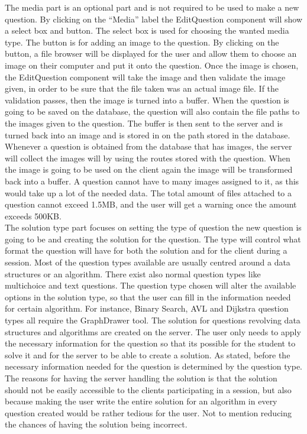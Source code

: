 The media part is an optional part and is not required to be used to make a new question. By clicking on the “Media” label the EditQuestion component will show a select box and button. The select box is used for choosing the wanted media type. The button is for adding an image to the question. By clicking on the button, a file browser will be displayed for the user and allow them to choose an image on their computer and put it onto the question. Once the image is chosen, the EditQuestion component will take the image and then validate the image given, in order to be sure that the file taken was an actual image file. If the validation passes, then the image is turned into a buffer. When the question is going to be saved on the database, the question will also contain the file paths to the images given to the question. The buffer is then sent to the server and is turned back into an image and is stored in on the path stored in the database. Whenever a question is obtained from the database that has images, the server will collect the images will by using the routes stored with the question. When the image is going to be used on the client again the image will be transformed back into a buffer. A question cannot have to many images assigned to it, as this would take up a lot of the needed data. The total amount of files attached to a question cannot exceed 1.5MB, and the user will get a warning once the amount exceeds 500KB.\\[11pt]
The solution type part focuses on setting the type of question the new question is going to be and creating the solution for the question. The type will control what format the question will have for both the solution and for the client during a session. Most of the question types available are usually centred around a data structures or an algorithm. There exist also normal question types like multichoice and text questions. The question type chosen will alter the available options in the solution type, so that the user can fill in the information needed for certain algorithm. For instance, Binary Search, AVL and Dijkstra question types all require the GraphDrawer tool. The solution for questions revolving data structures and algorithms are created on the server. The user only needs to apply the necessary information for the question so that its possible for the student to solve it and for the server to be able to create a solution. As stated, before the necessary information needed for the question is determined by the question type. The reasons for having the server handling the solution is that the solution should not be easily accessible to the clients participating in a session, but also because making the user write the entire solution for an algorithm in every question created would be rather tedious for the user. Not to mention reducing the chances of having the solution being incorrect.

